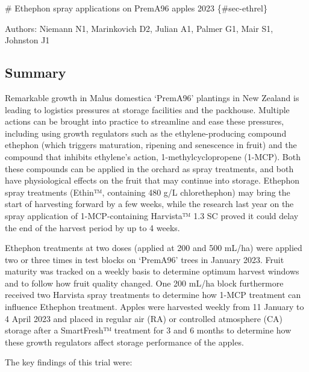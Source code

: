 \documentclass[
  letterpaper,
  DIV=11,
  numbers=noendperiod]{scrartcl}
\author{}
\date{}
\begin{document}
\ifdefined\Shaded\renewenvironment{Shaded}{\begin{tcolorbox}[sharp corners, borderline west={3pt}{0pt}{shadecolor}, boxrule=0pt, enhanced, breakable, interior hidden, frame hidden]}{\end{tcolorbox}}\fi

\# Ethephon spray applications on PremA96 apples 2023 \{\#sec-ethrel\}

Authors: Niemann N1, Marinkovich D2, Julian A1, Palmer G1, Mair S1,
Johnston J1

\hypertarget{summary}{%
\subsection{Summary}\label{summary}}

Remarkable growth in Malus domestica `PremA96' plantings in New Zealand
is leading to logistics pressures at storage facilities and the
packhouse. Multiple actions can be brought into practice to streamline
and ease these pressures, including using growth regulators such as the
ethylene-producing compound ethephon (which triggers maturation,
ripening and senescence in fruit) and the compound that inhibits
ethylene's action, 1-methylcyclopropene (1-MCP). Both these compounds
can be applied in the orchard as spray treatments, and both have
physiological effects on the fruit that may continue into storage.
Ethephon spray treatments (Ethin™, containing 480 g/L chlorethephon) may
bring the start of harvesting forward by a few weeks, while the research
last year on the spray application of 1-MCP-containing Harvista™ 1.3 SC
proved it could delay the end of the harvest period by up to 4 weeks.

Ethephon treatments at two doses (applied at 200 and 500 mL/ha) were
applied two or three times in test blocks on `PremA96' trees in January
2023. Fruit maturity was tracked on a weekly basis to determine optimum
harvest windows and to follow how fruit quality changed. One 200 mL/ha
block furthermore received two Harvista spray treatments to determine
how 1-MCP treatment can influence Ethephon treatment. Apples were
harvested weekly from 11 January to 4 April 2023 and placed in regular
air (RA) or controlled atmosphere (CA) storage after a SmartFresh™
treatment for 3 and 6 months to determine how these growth regulators
affect storage performance of the apples.

The key findings of this trial were:
\end{document}
